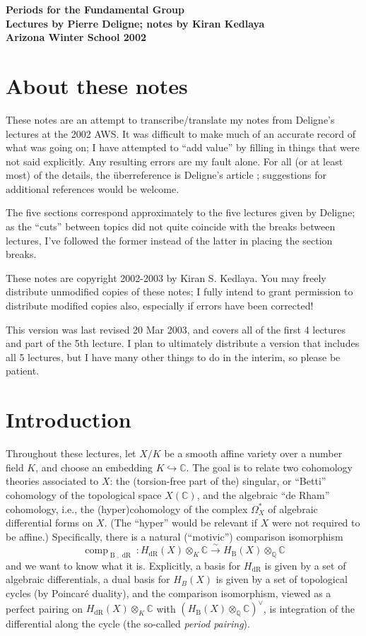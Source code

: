 \documentclass[12pt]{article}
\def\CC{\mathbb{C}}
\def\QQ{\mathbb{Q}}
\def\dual{\vee}
\DeclareMathOperator{\B}{B}
\DeclareMathOperator{\comp}{comp}
\DeclareMathOperator{\dR}{dR}
\begin{document}
\begin{center}
\bf
Periods for the Fundamental Group \\
Lectures by Pierre Deligne; notes by Kiran Kedlaya \\
Arizona Winter School 2002
\end{center}

\section*{About these notes}

These notes are an attempt to transcribe/translate my notes from Deligne's
lectures at the 2002 AWS. It was difficult to make much of an accurate record
of what was going on; I have attempted to ``add value'' by filling in things
that were not said explicitly. Any resulting errors are my fault alone.
For all (or at least most) of the details, the \"uberreference is
Deligne's article \cite{bib:del}; suggestions for additional references
would be welcome.

The five sections correspond approximately to the five lectures given by
Deligne; as the ``cuts'' between topics did not quite coincide with the
breaks between lectures, I've followed the former instead of the latter
in placing the section breaks.

These notes are copyright 2002-2003 by Kiran S. Kedlaya. You may freely
distribute unmodified 
copies of these notes; I fully intend to grant permission to distribute
modified copies also, especially if errors have been corrected!

This version was last revised 20 Mar 2003, and covers all of the first
4 lectures and part of the 5th lecture.
I plan to ultimately distribute a version that includes all 5
lectures, but I have many other things to do in the interim, so please
be patient.

\section{Introduction}

Throughout these lectures, let $X/K$ be a smooth affine variety over a
number field $K$, and choose an embedding $K \hookrightarrow \CC$.
The goal is to relate two cohomology theories associated to $X$: the
(torsion-free part of the)
singular, or ``Betti'' cohomology of the topological space $X(\CC)$,
and the algebraic ``de Rham'' cohomology, i.e., the (hyper)cohomology of
the complex $\Omega_X^*$ of algebraic differential forms on $X$. (The ``hyper''
would be relevant if $X$ were not required to be affine.) Specifically,
there is a natural (``motivic'') comparison isomorphism
\[
\comp_{\B,\dR}: H_{\dR}(X) \otimes_K \CC \stackrel{\sim}{\to}
H_{\B}(X) \otimes_{\QQ} \CC
\]
and we want to know what it is. Explicitly, a basis for $H_{\dR}$ is given
by a set of algebraic differentials, a dual basis for $H_B(X)$ is given by
a set of topological cycles (by Poincar\'e duality),
and the comparison isomorphism, viewed as a
perfect pairing on $H_{\dR}(X) \otimes_K \CC$ with
$(H_{\B}(X) \otimes_{\QQ} \CC)^\dual$, is integration of the differential along
the cycle (the so-called \emph{period pairing}).
\end{document}
